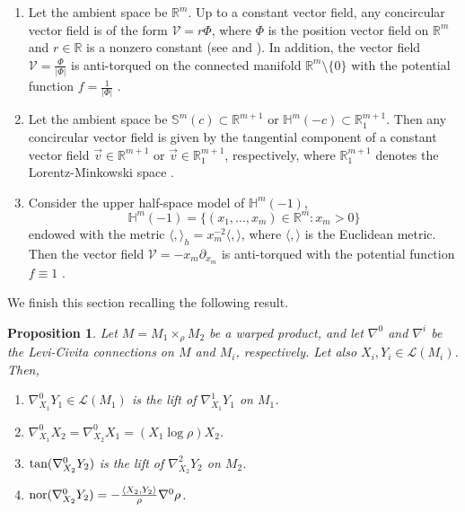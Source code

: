 \documentclass[12pt]{amsart}
\def\r{\mathbb R}
\def\s{\mathbb S}
\def\h{\mathbb H}
\def\v{\mathcal V}
\newtheorem{proposition}[theorem]{Proposition}
\theoremstyle{definition}
\begin{document}
\begin{enumerate}
\item[(i)] Let the ambient space be $\r^m$. Up to a constant vector field, any concircular vector field is of the form $\v=r\Phi$, where $\Phi$ is the position vector field on $\r^m$ and $r\in \r$ is a nonzero constant (see \cite[Remark 2.1] {c01} and \cite[Proposition 4.2]{c02}). In addition, the vector field $\v=\frac{\Phi}{|\Phi|}$ is anti-torqued on the connected manifold $\r^m\setminus\{0\}$ with the potential function $f=\frac{1}{|\Phi|}$ \cite[Example 5]{dan}. 
\item[(ii)] Let the ambient space be $\s^m(c)\subset\r^{m+1}$ or $\h^m(-c)\subset\r^{m+1}_1$. Then any concircular vector field is given by the tangential component of a constant vector field $\vec{v}\in \r^{m+1}$ or $\vec{v}\in \r^{m+1}_1$, respectively, where $ \r^{m+1}_1$ denotes the Lorentz-Minkowski space \cite[Theorem 1]{loy5}.
\item[(iii)] Consider the upper half-space model of $\h^m(-1)$, $$\h^m(-1)=\{(x_1,...,x_m)\in \r^m:x_m>0\}$$ endowed with the metric $\langle,\rangle_h=x_m^{-2}\langle,\rangle$, where $\langle,\rangle$ is the Euclidean metric. Then the vector field $\v=-x_m\partial_{x_m}$ is anti-torqued with the potential function $f\equiv1$ \cite[Example 3.3]{amc}.
\end{enumerate}



We finish this section recalling the following result.

\begin{proposition} \cite{cbook} \label{warp-con}
Let $M=M_1 \times_{\rho} M_2$ be a warped product, and let $\nabla^0$ and $\nabla^i$ be the Levi-Civita connections on $M$ and $M_i$, respectively. Let also $X_i,Y_i \in \mathcal{L}(M_i)$. Then,
\begin{enumerate}
\item[(i)]  $\nabla^0_{X_1}Y_1 \in \mathcal{L}(M_1) $ is the lift of $\nabla^1_{X_1}Y_1$ on $M_1$.
\item[(ii)]  $\nabla^0_{X_1}X_2 =\nabla^0_{X_2}X_1 =(X_1 \log \rho)X_2$.
\item[(iii)]  $\textnormal{tan}(\nabla^0_{X_2}Y_2)$ is the lift of $\nabla^2_{X_2}Y_2$ on $M_2$.
\item[(iv)]  $\textnormal{nor}(\nabla^0_{X_2}Y_2)=-\frac{\langle X_2,Y_2\rangle}{\rho}\nabla^0\rho$.
\end{enumerate}
\end{proposition}
\end{document}
